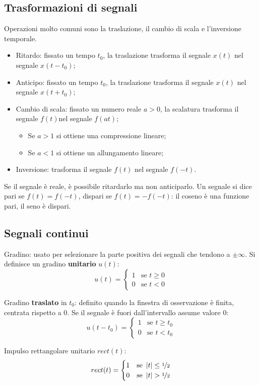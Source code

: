 \subsection{Trasformazioni di segnali}
Operazioni molto comuni sono la traslazione, il cambio di scala e l'inversione temporale. 
\begin{itemize}
	\item Ritardo: fissato un tempo $t_0$, la traslazione trasforma il segnale $x(t)$ nel segnale $x(t - t_0)$;
	\item Anticipo: fissato un tempo $t_0$, la traslazione trasforma il segnale $x(t)$ nel segnale $x(t + t_0)$;
	\item Cambio di scala: fissato un numero reale $a > 0$, la scalatura trasforma il segnale $f(t)$nel segnale $f(at)$;
	\begin{itemize}
		\item Se $a > 1$ si ottiene una compressione lineare;
		\item Se $a < 1$ si ottiene un allungamento lineare;
	\end{itemize}
	\item Inversione: trasforma il segnale $f(t)$ nel segnale $f(-t)$.
\end{itemize}

Se il segnale è reale, è possibile ritardarlo ma non anticiparlo. Un segnale si dice pari se $f(t) = f(-t)$, dispari se $f(t) = -f(-t)$: il coseno è una funzione pari, il seno è dispari.

\subsection{Segnali continui}
Gradino: usato per selezionare la parte positiva dei segnali che tendono a $\pm \infty$. Si definisce un gradino \textbf{unitario} $u(t)$:
$$u(t) = \begin{cases}
1 & \text{se } t \geq 0 \\
0 & \text{se } t < 0
\end{cases}$$

Gradino \textbf{traslato} in $t_0$: definito quando la finestra di osservazione è finita, centrata rispetto a 0. Se il segnale è fuori dall'intervallo assume valore 0:
$$u(t - t_0) = \begin{cases}
1 & \text{se } t \geq t_0 \\
0 & \text{se } t < t_0
\end{cases}$$

Impulso rettangolare unitario $rect(t)$:
$$rect(t) = \begin{cases}
1 & \text{se } \left|t\right| \leq \nicefrac{1}{2} \\
0 & \text{se } \left|t\right| > \nicefrac{1}{2}
\end{cases}$$

